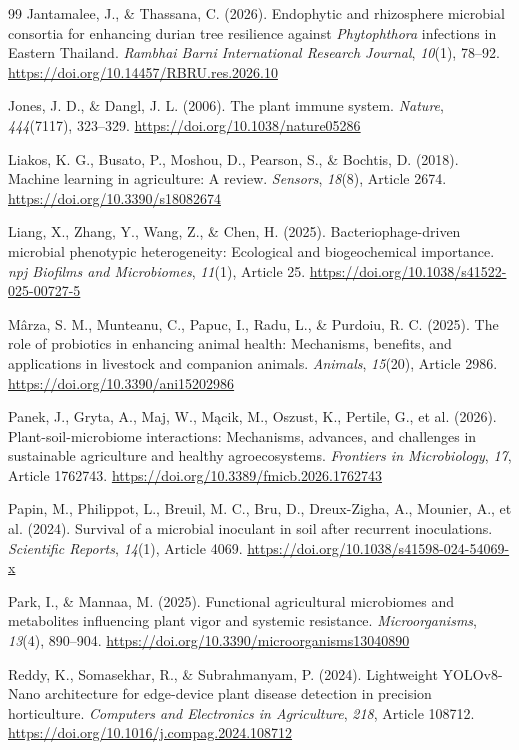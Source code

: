 \begin{thebibliography}{99}
 Jantamalee, J., \& Thassana, C. (2026). Endophytic and rhizosphere microbial consortia for enhancing durian tree resilience against \textit{Phytophthora} infections in Eastern Thailand. \textit{Rambhai Barni International Research Journal}, \textit{10}(1), 78--92. \url{https://doi.org/10.14457/RBRU.res.2026.10}

 Jones, J. D., \& Dangl, J. L. (2006). The plant immune system. \textit{Nature}, \textit{444}(7117), 323--329. \url{https://doi.org/10.1038/nature05286}

 Liakos, K. G., Busato, P., Moshou, D., Pearson, S., \& Bochtis, D. (2018). Machine learning in agriculture: A review. \textit{Sensors}, \textit{18}(8), Article 2674. \url{https://doi.org/10.3390/s18082674}

 Liang, X., Zhang, Y., Wang, Z., \& Chen, H. (2025). Bacteriophage-driven microbial phenotypic heterogeneity: Ecological and biogeochemical importance. \textit{npj Biofilms and Microbiomes}, \textit{11}(1), Article 25. \url{https://doi.org/10.1038/s41522-025-00727-5}

 Mârza, S. M., Munteanu, C., Papuc, I., Radu, L., \& Purdoiu, R. C. (2025). The role of probiotics in enhancing animal health: Mechanisms, benefits, and applications in livestock and companion animals. \textit{Animals}, \textit{15}(20), Article 2986. \url{https://doi.org/10.3390/ani15202986}

 Panek, J., Gryta, A., Maj, W., Mącik, M., Oszust, K., Pertile, G., et al. (2026). Plant-soil-microbiome interactions: Mechanisms, advances, and challenges in sustainable agriculture and healthy agroecosystems. \textit{Frontiers in Microbiology}, \textit{17}, Article 1762743. \url{https://doi.org/10.3389/fmicb.2026.1762743}

 Papin, M., Philippot, L., Breuil, M. C., Bru, D., Dreux-Zigha, A., Mounier, A., et al. (2024). Survival of a microbial inoculant in soil after recurrent inoculations. \textit{Scientific Reports}, \textit{14}(1), Article 4069. \url{https://doi.org/10.1038/s41598-024-54069-x}

 Park, I., \& Mannaa, M. (2025). Functional agricultural microbiomes and metabolites influencing plant vigor and systemic resistance. \textit{Microorganisms}, \textit{13}(4), 890--904. \url{https://doi.org/10.3390/microorganisms13040890}

 Reddy, K., Somasekhar, R., \& Subrahmanyam, P. (2024). Lightweight YOLOv8-Nano architecture for edge-device plant disease detection in precision horticulture. \textit{Computers and Electronics in Agriculture}, \textit{218}, Article 108712. \url{https://doi.org/10.1016/j.compag.2024.108712}


\end{thebibliography}
